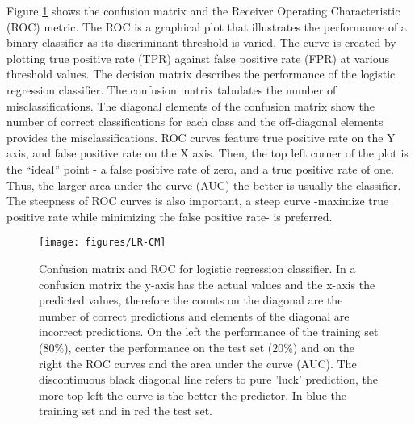 \documentclass[11pt]{article}
\theoremstyle{definition}
\theoremstyle{remark}
\begin{document}
Figure \ref{fig:lr-cm} shows the confusion matrix and the Receiver Operating Characteristic (ROC) metric. 
The ROC is a graphical plot that illustrates the performance of a binary classifier as its discriminant threshold is varied. The curve is created by plotting true positive rate (TPR) against false positive rate (FPR) at various threshold values.
The decision matrix describes the performance of the logistic regression classifier. The confusion matrix tabulates the number of misclassifications. The diagonal elements of the confusion matrix show the number of correct classifications for each class and the off-diagonal elements provides the misclassifications. 
ROC curves feature true positive rate on the Y axis, and false positive rate on the X axis. Then, the top left corner of the plot is the “ideal” point - a false positive rate of zero, and a true positive rate of one. 
Thus, the larger area under the curve (AUC) the better is usually the classifier.
The steepness of ROC curves is also important, a steep curve -maximize true positive rate while minimizing the false positive rate- is preferred.

\begin{figure}[H]
        \centering
        \texttt{[image: figures/LR-CM]}
        \caption{Confusion matrix and ROC for logistic regression classifier. In a confusion matrix the y-axis has the actual values and the x-axis the predicted values, therefore the counts on the diagonal are the number of correct predictions and elements of the diagonal are incorrect predictions.
        On the left the performance of the training set ($80\%$), center the performance on the test set ($20\%$) and on the right the ROC curves and the area under the curve (AUC). The discontinuous black diagonal line refers to pure 'luck' prediction, the more top left the curve is the better the predictor. In blue the training set and in red the test set.}
\label{fig:lr-cm}
\end{figure}
\end{document}
